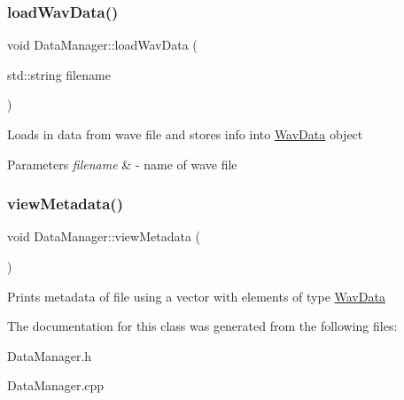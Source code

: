 \subsubsection{\texorpdfstring{load\+Wav\+Data()}{loadWavData()}}
{\footnotesize\ttfamily void Data\+Manager\+::load\+Wav\+Data (\begin{DoxyParamCaption}\item[{std\+::string}]{filename }\end{DoxyParamCaption})}

Loads in data from wave file and stores info into \hyperlink{classWavData}{Wav\+Data} object 
\begin{DoxyParams}{Parameters}
{\em filename} & -\/ name of wave file \\
\hline
\end{DoxyParams}
\mbox{\label{classDataManager_a90616c9fb33193856877a90e6583ef97}} 
\subsubsection{\texorpdfstring{view\+Metadata()}{viewMetadata()}}
{\footnotesize\ttfamily void Data\+Manager\+::view\+Metadata (\begin{DoxyParamCaption}{ }\end{DoxyParamCaption})}

Prints metadata of file using a vector with elements of type \hyperlink{classWavData}{Wav\+Data} 

The documentation for this class was generated from the following files\+:\begin{DoxyCompactItemize}
\item 
Data\+Manager.\+h\item 
Data\+Manager.\+cpp\end{DoxyCompactItemize}
